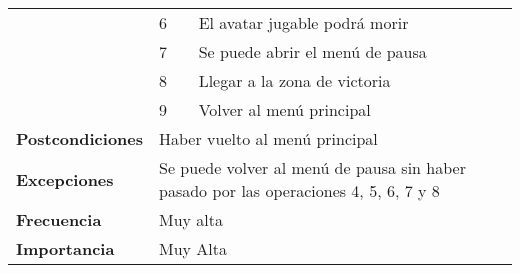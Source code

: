 \begin{longtable}{lll}
\multicolumn{1}{l|}{}                            & 6                                     & El avatar jugable podrá morir                                                                          \\
\multicolumn{1}{l|}{}                            & 7                                     & Se puede abrir el menú de pausa                                                                        \\
\multicolumn{1}{l|}{}                            & 8                                     & Llegar a la zona de victoria                                                                           \\
\multicolumn{1}{l|}{}                            & 9                                     & Volver al menú principal                                                                               \\ \hline
\textbf{Postcondiciones}                         & \multicolumn{2}{l}{Haber vuelto al menú principal}                                                                                             \\ \hline
\textbf{Excepciones}                             & \multicolumn{2}{l}{Se puede volver al menú de pausa sin haber pasado por las operaciones 4, 5, 6, 7 y 8}                                       \\ \hline
\textbf{Frecuencia}                              & \multicolumn{2}{l}{Muy alta}                                                                                                                   \\ \hline
\textbf{Importancia}                             & \multicolumn{2}{l}{Muy Alta}                                                                                                                   \\ \hline
\end{longtable}